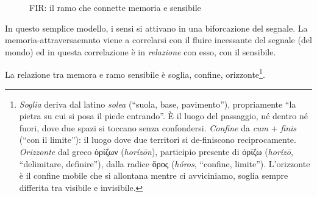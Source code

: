 \begin{figure}[htbp]
\begin{center}
\caption{FIR: il ramo che connette memoria e sensibile}
\label{slide6}
\end{center}
\end{figure}

In questo semplice modello, i sensi si attivano in una biforcazione del segnale. La memoria-attraversaemnto viene a correlarsi con il fluire incessante del segnale (del mondo) ed in questa correlazione è in \emph{relazione} con esso, con il sensibile.

La relazione tra memora e ramo sensibile è soglia, confine, orizzonte\footnote{%
\emph{Soglia} deriva dal latino \emph{solea} (“suola, base, pavimento”), propriamente “la pietra su cui si posa il piede entrando”. È il luogo del passaggio, né dentro né fuori, dove due spazi si toccano senza confondersi. \emph{Confine} da \emph{cum} + \emph{finis} (“con il limite”): il luogo dove due territori si de-finiscono reciprocamente. \emph{Orizzonte} dal greco \textgreek{ὁρίζων} (\emph{horízōn}), participio presente di \textgreek{ὁρίζω} (\emph{horízō}, “delimitare, definire”), dalla radice \textgreek{ὅρος} (\emph{hóros}, “confine, limite”). L'orizzonte è il confine mobile che si allontana mentre ci avviciniamo, soglia sempre differita tra visibile e invisibile.
}.

